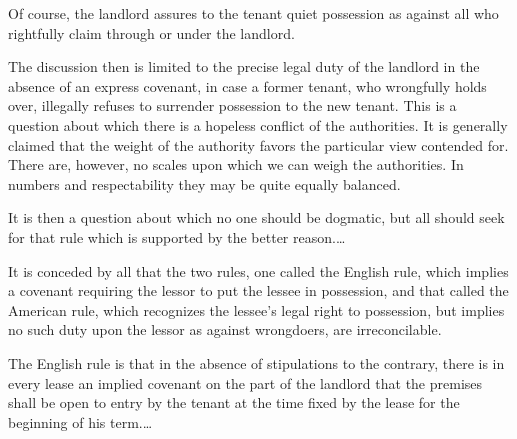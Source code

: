 Of course, the landlord assures to the tenant quiet possession as against all
who rightfully claim through or under the landlord.

The discussion then is limited to the precise legal duty of the landlord in the
absence of an express covenant, in case a former tenant, who wrongfully holds
over, illegally refuses to surrender possession to the new tenant. This is a
question about which there is a hopeless conflict of the authorities. It is
generally claimed that the weight of the authority favors the particular view
contended for. There are, however, no scales upon which we can weigh the
authorities. In numbers and respectability they may be quite equally balanced.

It is then a question about which no one should be dogmatic, but all should seek
for that rule which is supported by the better reason.\ldots

It is conceded by all that the two rules, one called the English rule, which
implies a covenant requiring the lessor to put the lessee in possession, and
that called the American rule, which recognizes the lessee's legal right to
possession, but implies no such duty upon the lessor as against wrongdoers, are
irreconcilable.

The English rule is that in the absence of stipulations to the contrary, there
is in every lease an implied covenant on the part of the landlord that the
premises shall be open to entry by the tenant at the time fixed by the lease
for the beginning of his term.\ldots


